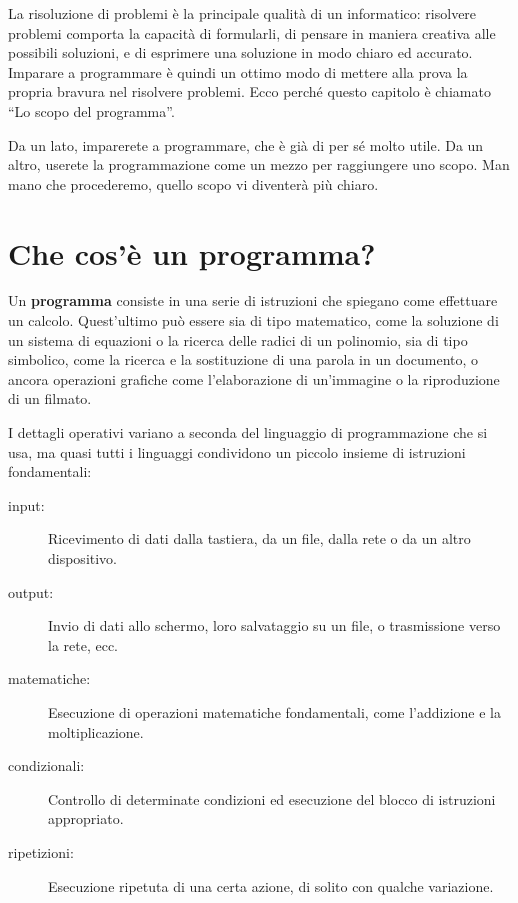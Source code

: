 \documentclass[10pt]{book}
\begin{document}
La risoluzione di problemi è la principale qualità di un informatico: risolvere problemi comporta la capacità di formularli, di pensare in maniera creativa alle possibili soluzioni, e di esprimere una soluzione in modo chiaro ed accurato. Imparare a programmare è quindi un ottimo modo di mettere alla prova la propria bravura nel risolvere problemi. Ecco perché questo capitolo è chiamato ``Lo scopo del programma''.

Da un lato, imparerete a programmare, che è già di per sé molto utile. Da un altro, userete la programmazione come un mezzo per raggiungere uno scopo. Man mano che procederemo, quello scopo vi diventerà più chiaro.


\section{Che cos'è un programma?}

Un {\bf programma} consiste in una serie di istruzioni che spiegano come effettuare un calcolo. Quest'ultimo può essere sia di tipo matematico, come la soluzione di un sistema di equazioni o la ricerca delle radici di un polinomio, sia di tipo simbolico, come la ricerca e la sostituzione di una parola in un documento, o ancora operazioni grafiche come l'elaborazione di un'immagine o la riproduzione di un filmato.

I dettagli operativi variano a seconda del linguaggio di programmazione che si usa, ma quasi tutti i linguaggi condividono un piccolo insieme di istruzioni fondamentali:

\begin{description}

\item[input:] Ricevimento di dati dalla tastiera, da un file, dalla rete o da un altro dispositivo.

\item[output:] Invio di dati allo schermo, loro salvataggio su un file, o trasmissione verso la rete, ecc.

\item[matematiche:] Esecuzione di operazioni matematiche fondamentali, come l'addizione e la moltiplicazione.

\item[condizionali:] Controllo di determinate condizioni ed esecuzione del blocco di istruzioni appropriato.

\item[ripetizioni:] Esecuzione ripetuta di una certa azione, di solito con qualche variazione.

\end{description}
\end{document}
